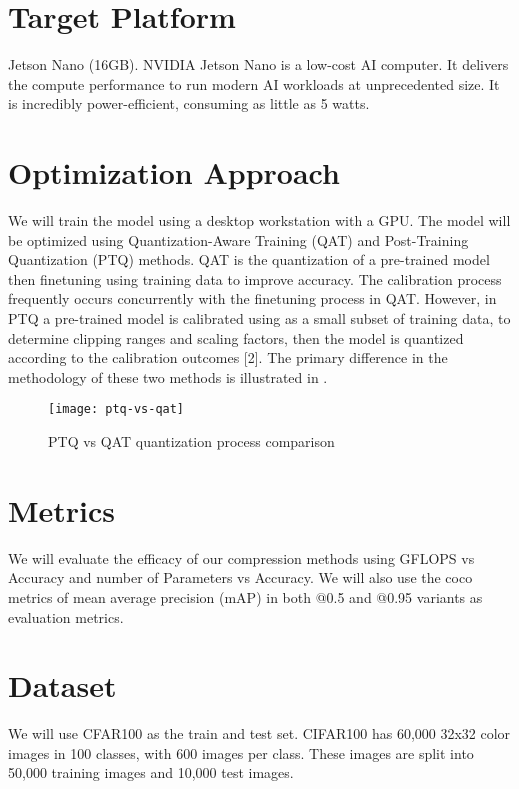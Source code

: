 \documentclass[12pt,english]{article}
\begin{document}
\section{Target Platform}

Jetson Nano (16GB).
NVIDIA Jetson Nano is a low-cost AI computer.
It delivers the compute performance to run modern AI workloads at unprecedented size.
It is incredibly power-efficient, consuming as little as 5 watts.

\section{Optimization Approach}

We will train the model using a desktop workstation with a GPU.
The model will be optimized using Quantization-Aware Training (QAT) and Post-Training Quantization (PTQ) methods.
QAT is the quantization of a pre-trained model then finetuning using training data to improve accuracy.
The calibration process frequently occurs concurrently with the finetuning process in QAT.
However, in PTQ a pre-trained model is calibrated using as a small subset of training data, to determine clipping ranges and scaling factors, then the model is quantized according to the calibration outcomes [2].
The primary difference in the methodology of these two methods is illustrated in .

\begin{figure}[h]
    \texttt{[image: ptq-vs-qat]}
    \caption{PTQ vs QAT quantization process comparison \cite{quantization-methods}}
    \label{fig:ptq-vs-qat}
\end{figure}

\section{Metrics}

We will evaluate the efficacy of our compression methods using GFLOPS vs Accuracy and number of Parameters vs Accuracy.
We will also use the coco metrics of mean average precision (mAP) in both @0.5 and @0.95 variants as evaluation metrics.

\section{Dataset}

We will use CFAR100 as the train and test set.
CIFAR100 has 60,000 32x32 color images in 100 classes, with 600 images per class.
These images are split into 50,000 training images and 10,000 test images.




\end{document}
